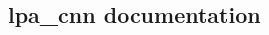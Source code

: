 \documentclass[12pt]{report}
\begin{document}
\newpage
{}
\listoftables\begin{center}\end{center}

\newpage
{}
\listoffigures

\clearpage

\setcounter{page}{1}

\begin{spacing}{1.15}
	
	
	
		
	
\end{spacing}
\newpage
\thispagestyle{empty}
\null

\begin{appendices}
\chapter{lpa\_cnn documentation}

\end{appendices}


\end{document}
